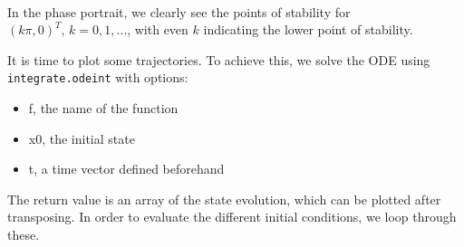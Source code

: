 \documentclass[11pt,a4paper, d]{scrartcl}
\providecommand{\tightlist}{%
      \setlength{\itemsep}{0pt}\setlength{\parskip}{0pt}}
\begin{document}
    \begin{center}
    \end{center}
    { \hspace*{\fill} \\}
    
    In the phase portrait, we clearly see the points of stability for
\((k\pi,0)^T,\, k = 0, 1,\ldots\), with even \(k\) indicating the lower
point of stability.

It is time to plot some trajectories. To achieve this, we solve the ODE
using \texttt{integrate.odeint} with options:

\begin{itemize}
\tightlist
\item
  f, the name of the function
\item
  x0, the initial state
\item
  t, a time vector defined beforehand
\end{itemize}

The return value is an array of the state evolution, which can be
plotted after transposing. In order to evaluate the different initial
conditions, we loop through these.
\end{document}
